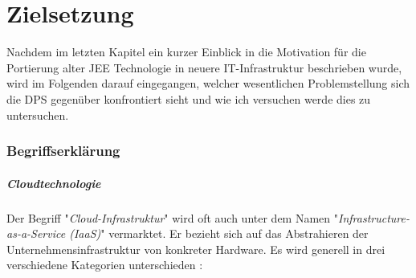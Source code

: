 \chapter{Zielsetzung \checkmark \checkmark}

Nachdem im letzten Kapitel ein kurzer Einblick in die Motivation für die Portierung alter JEE Technologie in neuere IT-Infrastruktur beschrieben wurde, wird im Folgenden darauf eingegangen, welcher wesentlichen Problemstellung sich die DPS gegenüber konfrontiert sieht und wie ich versuchen werde dies zu untersuchen.


\subsection{Begriffserklärung \checkmark \checkmark}

\paragraph{Cloudtechnologie}
Der Begriff "\emph{Cloud-Infrastruktur}" wird oft auch unter dem Namen "\emph{Infrastructure-as-a-Service (IaaS)}" vermarktet. Er bezieht sich auf das Abstrahieren der Unternehmensinfrastruktur von konkreter Hardware. Es wird generell in drei verschiedene Kategorien unterschieden \cite[Seite~54]{continuous-delivery}:

